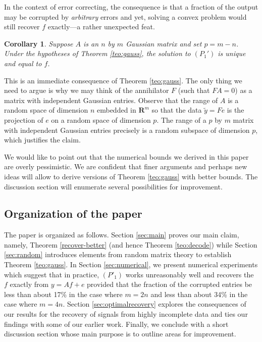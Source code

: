 \documentclass[11pt]{article}
\def\R{{{\mathbf{R}}}} %
\newcommand{\<}{\langle}
\renewcommand{\>}{\rangle}
\newtheorem{corollary}[theorem]{Corollary}
\numberwithin{equation}{section}
\begin{document}
In the context of error correcting, the consequence is that a fraction
of the output may be corrupted by {\em arbitrary} errors and yet,
solving a convex problem would still recover $f$ exactly---a rather
unexpected feat.
\begin{corollary}
  Suppose $A$ is an $n$ by $m$ Gaussian matrix and set $p = m - n$.
  Under the hypotheses of Theorem \ref{teo:gauss}, the solution to
  $(P_1')$ is unique and equal to $f$. 
\end{corollary}
This is an immediate consequence of Theorem \ref{teo:gauss}. The only
thing we need to argue is why we may think of the annihilator $F$
(such that $FA = 0$) as a matrix with independent Gaussian entries.
Observe that the range of $A$ is a random space of dimension $n$
embedded in $\R^m$ so that the data $\tilde y = F e$ is the projection
of $e$ on a random space of dimension $p$.  The range of a $p$ by $m$
matrix with independent Gaussian entries precisely is a random
subspace of dimension $p$, which justifies the claim.

We would like to point out that the numerical bounds we derived in
this paper are overly pessimistic. We are confident that finer
arguments and perhaps new ideas will allow to derive versions of
Theorem \ref{teo:gauss} with better bounds. The discussion section
will enumerate several possibilities for improvement.

\subsection{Organization of the paper}

The paper is organized as follows. Section \ref{sec:main} proves our
main claim, namely, Theorem \ref{recover-better} (and hence Theorem
\ref{teo:decode}) while Section \ref{sec:random} introduces elements
from random matrix theory to establish Theorem \ref{teo:gauss}. In
Section \ref{sec:numerical}, we present numerical experiments which
suggest that in practice, $(P'_1)$ works unreasonably well and
recovers the $f$ exactly from $y = Af + e$ provided that the fraction
of the corrupted entries be less than about 17\% in the case where $m
= 2n$ and less than about 34\% in the case where $m = 4n$. Section
\ref{sec:optimalrecovery} explores the consequences of our results for
the recovery of signals from highly incomplete data and ties our
findings with some of our earlier work. Finally, we conclude with a
short discussion section whose main purpose is to outline areas for
improvement.
\end{document}
